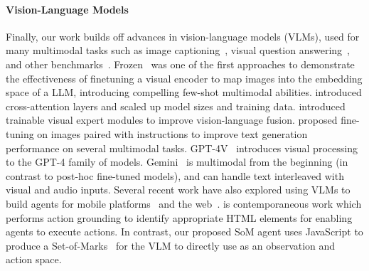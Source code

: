 \paragraph{Vision-Language Models}
Finally, our work builds off advances in vision-language models (VLMs), used for many multimodal tasks such as image captioning~\citep{vinyals2015show}, visual question answering~\citep{antol2015vqa}, and other benchmarks~\citep{mialon2023gaia,yue2023mmmu,tong2024eyes}.
Frozen~\citep{tsimpoukelli2021multimodal} was one of the first approaches to demonstrate the effectiveness of finetuning a visual encoder to map images into the embedding space of a LLM, introducing compelling few-shot multimodal abilities. \citet{alayrac2022flamingo} introduced cross-attention layers and scaled up model sizes and training data. \citet{wang2023cogvlm} introduced trainable visual expert modules to improve vision-language fusion. \citet{liu2023visual} proposed fine-tuning on images paired with instructions to improve text generation performance on several multimodal tasks. GPT-4V~\citep{openai2023gpt4} introduces visual processing to the GPT-4 family of models. 
Gemini~\citep{team2023gemini} is multimodal from the beginning (in contrast to post-hoc fine-tuned models), and can handle text interleaved with visual and audio inputs. 
Several recent work have also explored using VLMs to build agents for mobile platforms~\citep{zhan2023you,chu2023mobilevlm,yang2023appagent} and the web~\citep{gur2023real,hong2023cogagent}. \citet{zheng2024gpt} is contemporaneous work which performs action grounding to identify appropriate HTML elements for enabling agents to execute actions. In contrast, our proposed SoM agent uses JavaScript to produce a Set-of-Marks~\citep{yang2023som} for the VLM to directly use as an observation and action space.
